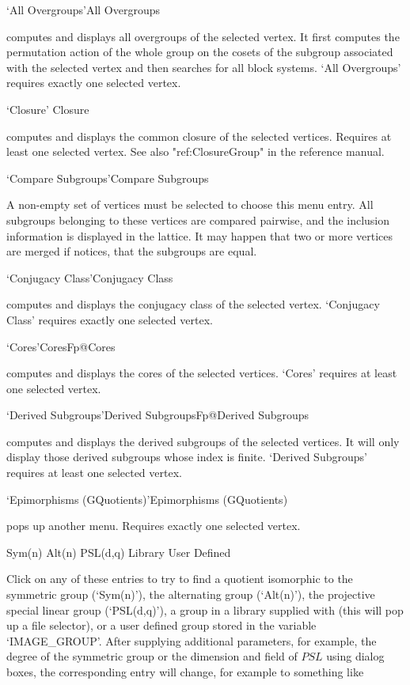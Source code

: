 \>`All Overgroups'{All Overgroups}

computes and displays all overgroups  of the selected vertex.  It  first
computes the permutation action of the whole  group on the cosets of the
subgroup associated with  the selected vertex and  then searches  for all
block systems.  `All Overgroups' requires exactly one selected vertex.

\>`Closure' {Closure}

computes and displays the common closure of the selected vertices.
Requires at least one selected vertex. See also "ref:ClosureGroup" in the
{\GAP} reference manual.

\>`Compare Subgroups'{Compare Subgroups}

A non-empty set of vertices must be selected to choose this menu entry. All
subgroups belonging to these vertices are compared pairwise, and the inclusion
information is displayed in the lattice. It may happen that two or more
vertices are merged if {\GAP} notices, that the subgroups are
equal. 

\>`Conjugacy Class'{Conjugacy Class}

computes and  displays  the   conjugacy  class of  the   selected vertex.
`Conjugacy Class' requires  exactly  one selected vertex.  

\>`Cores'{CoresFp}@{Cores}

computes and  displays the cores  of the selected vertices.   `Cores'
requires at least one selected vertex.

\>`Derived Subgroups'{Derived SubgroupsFp}@{Derived Subgroups}

computes and displays the derived subgroups of the selected vertices.  It
will  only  display  those derived    subgroups  whose index is   finite.
`Derived Subgroups' requires at least one selected vertex.

\>`Epimorphisms (GQuotients)'{Epimorphisms (GQuotients)}

pops up another menu. Requires exactly one selected vertex.

\begintt
Sym(n)
Alt(n)
PSL(d,q)
Library
User Defined 
\endtt

Click on any of these entries to try to find a quotient isomorphic to the
symmetric group (`Sym(n)'), the alternating group (`Alt(n)'), the projective
special linear group (`PSL(d,q)'), a group in a library supplied with
{\XGAP} (this will pop up a file selector), or a user defined group stored
in the variable `IMAGE_GROUP'.  After supplying additional parameters, for
example, the degree of the symmetric group or the dimension and field of
$PSL$ using dialog boxes, the corresponding entry will change, for example
to something like

